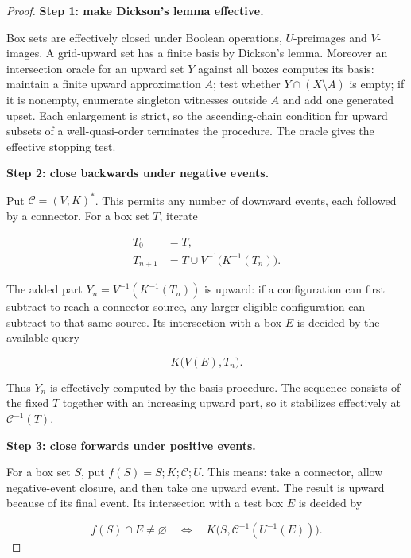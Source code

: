 \documentclass[11pt,a4paper]{article}
\theoremstyle{remark}
\begin{document}
\begin{proof}
\textbf{Step 1: make Dickson's lemma effective.}

Box sets are effectively closed under Boolean operations, \(U\)-preimages and \(V\)-images. A grid-upward set has a finite basis by Dickson's lemma. Moreover an intersection oracle for an upward set \(Y\) against all boxes computes its basis: maintain a finite upward approximation \(A\); test whether \(Y\cap(X\setminus A)\) is empty; if it is nonempty, enumerate singleton witnesses outside \(A\) and add one generated upset. Each enlargement is strict, so the ascending-chain condition for upward subsets of a well-quasi-order terminates the procedure. The oracle gives the effective stopping test.

\medskip
\noindent\textbf{Step 2: close backwards under negative events.}

Put \(\mathcal C=(V;K)^*\). This permits any number of downward
events, each followed by a connector. For a box set \(T\), iterate

\begin{equation}
\begin{aligned}T_0&=T,\\ T_{n+1}&=T\cup V^{-1}\bigl(K^{-1}(T_n)\bigr).\end{aligned}\label{eq:backward}
\end{equation}


The added part
\(Y_n=V^{-1}(K^{-1}(T_n))\) is upward: if a configuration can first
subtract to reach a connector source, any larger eligible configuration
can subtract to that same source. Its intersection with a box \(E\) is decided by the available query

\begin{equation*}
K\bigl(V(E),T_n\bigr).
\end{equation*}


Thus \(Y_n\) is effectively computed by the basis procedure. The sequence consists of the fixed \(T\) together with an increasing upward part, so it stabilizes effectively at \(\mathcal C^{-1}(T)\).

\medskip
\noindent\textbf{Step 3: close forwards under positive events.}

For a box set \(S\), put \(f(S)=S;K;\mathcal C;U\). This means:
take a connector, allow negative-event closure, and then take one
upward event. The result is upward because of its final event. Its
intersection with a test box \(E\) is decided by

\begin{equation}
f(S)\cap E\neq\varnothing\quad\Longleftrightarrow\quad K\bigl(S,\mathcal C^{-1}(U^{-1}(E))\bigr). \label{eq:forward-query}
\end{equation}



\end{proof}
\end{document}
